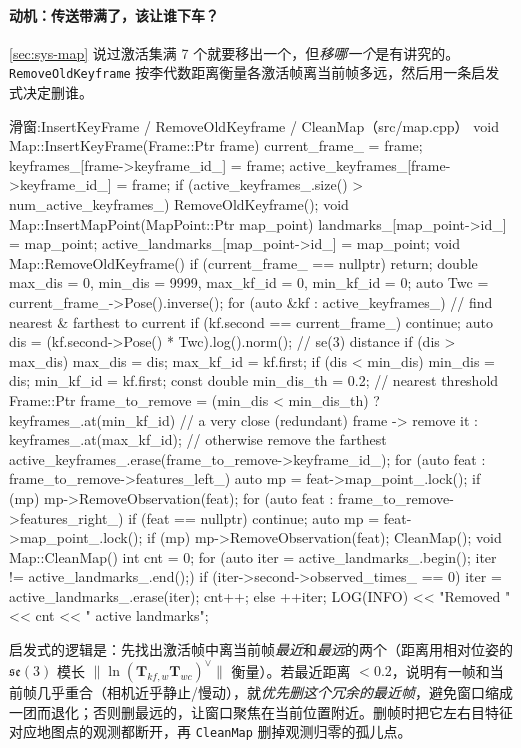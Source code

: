 \paragraph{动机：传送带满了，该让谁下车？}
\cref{sec:sys-map} 说过激活集满 7 个就要移出一个，但\emph{移哪一个}是有讲究的。\texttt{RemoveOldKeyframe} 按李代数距离衡量各激活帧离当前帧多远，然后用一条启发式决定删谁。

\begin{codebox}[C++]{滑窗:InsertKeyFrame / RemoveOldKeyframe / CleanMap（src/map.cpp）}
void Map::InsertKeyFrame(Frame::Ptr frame) {
    current_frame_ = frame;
    keyframes_[frame->keyframe_id_] = frame;
    active_keyframes_[frame->keyframe_id_] = frame;
    if (active_keyframes_.size() > num_active_keyframes_) RemoveOldKeyframe();
}
void Map::InsertMapPoint(MapPoint::Ptr map_point) {
    landmarks_[map_point->id_] = map_point;
    active_landmarks_[map_point->id_] = map_point;
}
void Map::RemoveOldKeyframe() {
    if (current_frame_ == nullptr) return;
    double max_dis = 0, min_dis = 9999, max_kf_id = 0, min_kf_id = 0;
    auto Twc = current_frame_->Pose().inverse();
    for (auto &kf : active_keyframes_) {            // find nearest & farthest to current
        if (kf.second == current_frame_) continue;
        auto dis = (kf.second->Pose() * Twc).log().norm();  // se(3) distance
        if (dis > max_dis) { max_dis = dis; max_kf_id = kf.first; }
        if (dis < min_dis) { min_dis = dis; min_kf_id = kf.first; }
    }
    const double min_dis_th = 0.2;                  // nearest threshold
    Frame::Ptr frame_to_remove = (min_dis < min_dis_th)
        ? keyframes_.at(min_kf_id)   // a very close (redundant) frame -> remove it
        : keyframes_.at(max_kf_id);  // otherwise remove the farthest
    active_keyframes_.erase(frame_to_remove->keyframe_id_);
    for (auto feat : frame_to_remove->features_left_) {
        auto mp = feat->map_point_.lock();  if (mp) mp->RemoveObservation(feat);
    }
    for (auto feat : frame_to_remove->features_right_) {
        if (feat == nullptr) continue;
        auto mp = feat->map_point_.lock();  if (mp) mp->RemoveObservation(feat);
    }
    CleanMap();
}
void Map::CleanMap() {
    int cnt = 0;
    for (auto iter = active_landmarks_.begin(); iter != active_landmarks_.end();) {
        if (iter->second->observed_times_ == 0) { iter = active_landmarks_.erase(iter); cnt++; }
        else ++iter;
    }
    LOG(INFO) << "Removed " << cnt << " active landmarks";
}
\end{codebox}

\noindent 启发式的逻辑是：先找出激活帧中离当前帧\emph{最近}和\emph{最远}的两个（距离用相对位姿的 $\mathfrak{se}(3)$ 模长 $\|\ln(\mathbf{T}_{kf,w}\mathbf{T}_{wc})^\vee\|$ 衡量）。若最近距离 $<0.2$，说明有一帧和当前帧几乎重合（相机近乎静止/慢动），就\emph{优先删这个冗余的最近帧}，避免窗口缩成一团而退化；否则删最远的，让窗口聚焦在当前位置附近。删帧时把它左右目特征对应地图点的观测都断开，再 \texttt{CleanMap} 删掉观测归零的孤儿点。

